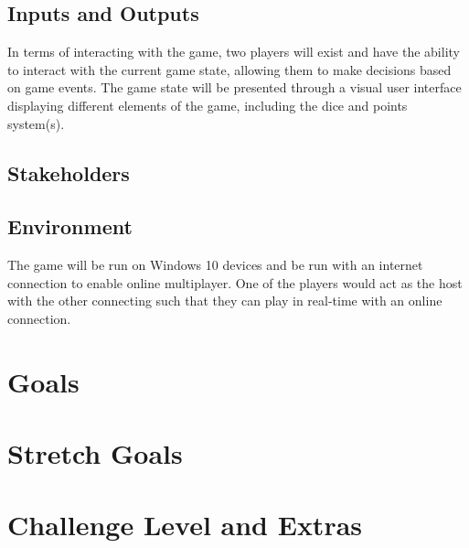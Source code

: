\documentclass{article}
\begin{document}
\subsection{Inputs and Outputs}


In terms of interacting with the game, two players will exist and have the ability to interact with the current game state, allowing them to make decisions based on game events. The game state will be presented through a visual user interface displaying different elements of the game, including the dice and points system(s).

\subsection{Stakeholders}

\subsection{Environment}


The game will be run on Windows 10 devices and be run with an internet connection to enable online multiplayer. One of the players would act as the host with the other connecting such that they can play in real-time with an online connection.

\section{Goals}

\section{Stretch Goals}

\section{Challenge Level and Extras}

\iffalse
{}
\end{document}
